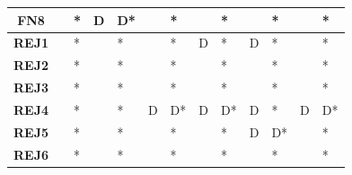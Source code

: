 \begin{table}
\begin{tabularx}{\textwidth}{ c YYYYYYYYYYYY}
        \textbf{FN8}  &                                  & *                                    & D                                      & D*                                       &                                       & *                                      &             & *          &             & *          &             & *          \\
        \midrule
        \textbf{REJ1} &                                  & *                                    &                                        & *                                        &                                       & *                                      & D           & *          & D           & *          &             & *          \\
        \textbf{REJ2} &                                  & *                                    &                                        & *                                        &                                       & *                                      &             & *          &             & *          &             & *          \\
        \textbf{REJ3} &                                  & *                                    &                                        & *                                        &                                       & *                                      &             & *          &             & *          &             & *          \\
        \textbf{REJ4} &                                  & *                                    &                                        & *                                        & D                                     & D*                                     & D           & D*         & D           & *          & D           & D*         \\
        \textbf{REJ5} &                                  & *                                    &                                        & *                                        &                                       & *                                      &             & *          & D           & D*         &             & *          \\
        \textbf{REJ6} &                                  & *                                    &                                        & *                                        &                                       & *                                      &             & *          &             & *          &             & *          \\

\end{tabularx}
\end{table}
